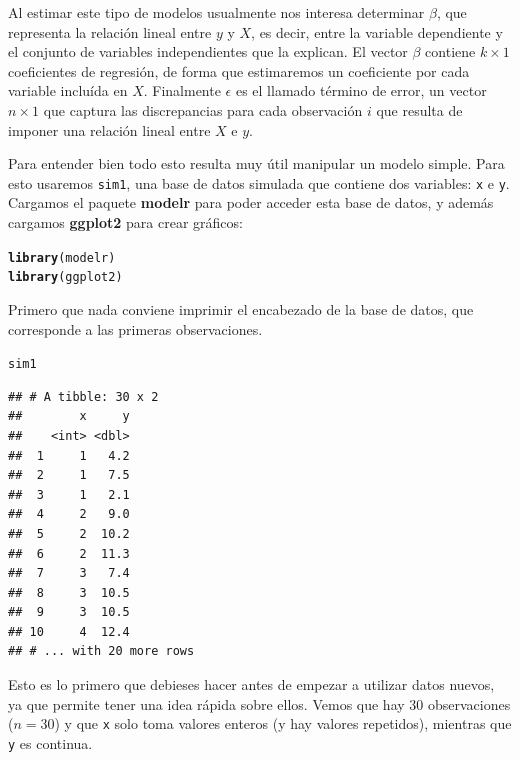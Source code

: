 \documentclass{article}\usepackage[]{graphicx}\usepackage[]{color}
\makeatletter
\newcommand{\hlstd}[1]{\textcolor[rgb]{0.345,0.345,0.345}{#1}}%
\newcommand{\hlkwd}[1]{\textcolor[rgb]{0.737,0.353,0.396}{\textbf{#1}}}%
\newenvironment{kframe}{%
 \def\at@end@of@kframe{}%
 \ifinner\ifhmode%
  \def\at@end@of@kframe{\end{minipage}}%
  \begin{minipage}{\columnwidth}%
 \fi\fi%
 \def\FrameCommand##1{\hskip\@totalleftmargin \hskip-\fboxsep
 \colorbox{shadecolor}{##1}\hskip-\fboxsep
     \hskip-\linewidth \hskip-\@totalleftmargin \hskip\columnwidth}%
 \MakeFramed {\advance\hsize-\width
   \@totalleftmargin\z@ \linewidth\hsize
   \@setminipage}}%
 {\par\unskip\endMakeFramed%
 \at@end@of@kframe}
\newenvironment{knitrout}{}{} %
\newcommand*{\paq}[1]{\textbf{#1}}
\makeatother
\begin{document}
Al estimar este tipo de modelos usualmente nos interesa determinar $\beta$, que representa la relación lineal entre $y$ y $X$, es decir, entre la variable dependiente y el conjunto de variables independientes que la explican. El vector $\beta$ contiene $k \times 1$ coeficientes de regresión, de forma que estimaremos un coeficiente por cada variable incluída en $X$.
Finalmente $\epsilon$ es el llamado término de error, un vector $n \times 1$ que captura las discrepancias para cada observación $i$ que resulta de imponer una relación lineal entre $X$ e $y$.

Para entender bien todo esto resulta muy útil manipular un modelo simple. Para esto usaremos \verb|sim1|, una base de datos simulada que contiene dos variables: \verb|x| e \verb|y|. Cargamos el paquete \paq{modelr} para poder acceder esta base de datos, y además cargamos \paq{ggplot2} para crear gráficos:

\begin{knitrout}
\color{fgcolor}\begin{kframe}
\begin{alltt}
\hlkwd{library}\hlstd{(modelr)}
\hlkwd{library}\hlstd{(ggplot2)}
\end{alltt}
\end{kframe}
\end{knitrout}

Primero que nada conviene imprimir el encabezado de la base de datos, que corresponde a las primeras observaciones.

\begin{knitrout}
\color{fgcolor}\begin{kframe}
\begin{alltt}
\hlstd{sim1}
\end{alltt}
\begin{verbatim}
## # A tibble: 30 x 2
##        x     y
##    <int> <dbl>
##  1     1   4.2
##  2     1   7.5
##  3     1   2.1
##  4     2   9.0
##  5     2  10.2
##  6     2  11.3
##  7     3   7.4
##  8     3  10.5
##  9     3  10.5
## 10     4  12.4
## # ... with 20 more rows
\end{verbatim}
\end{kframe}
\end{knitrout}

Esto es lo primero que debieses hacer antes de empezar a utilizar datos nuevos, ya que permite tener una idea rápida sobre ellos. Vemos que hay 30 observaciones ($n=30$) y que \verb|x| solo toma valores enteros (y hay valores repetidos), mientras que \verb|y| es continua.
\end{document}
